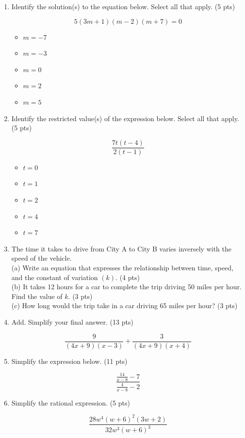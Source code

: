 \documentclass{ximera}
\begin{document}
\begin{enumerate}
\item Identify the solution(s) to the equation below. Select all that apply. (5 pts)

$$5(3 m+1)(m-2)(m+7)=0$$

\begin{itemize}
\item $m=-7$
\item $m=-3$
\item $m=0$
\item $m=2$
\item $m=5$
\end{itemize}

\item Identify the restricted value(s) of the expression below. Select all that apply. (5 pts)

$$\frac{7 t(t-4)}{2(t-1)}$$

\begin{itemize}
\item $t=0$
\item $t=1$
\item $t=2$
\item $t=4$
\item $t=7$
\end{itemize}

\item The time it takes to drive from City A to City B varies inversely with the speed of the vehicle.\\
(a) Write an equation that expresses the relationship between time, speed, and the constant of variation $(k)$. (4 pts)\\
(b) It takes 12 hours for a car to complete the trip driving 50 miles per hour. Find the value of $k$. (3 pts)\\
(c) How long would the trip take in a car driving 65 miles per hour? (3 pts)

\item Add. Simplify your final answer. (13 pts)

$$\frac{9}{(4 x+9)(x-3)}+\frac{3}{(4 x+9)(x+4)}$$

\item Simplify the expression below. (11 pts)

$$\frac{\frac{14}{x-8}-7}{\frac{4}{x-8}-2}$$

\item Simplify the rational expression. (5 pts)

$$\frac{28 w^{4}(w+6)^{2}(3 w+2)}{32 w^{3}(w+6)^{3}}$$


\end{enumerate}
\end{document}
